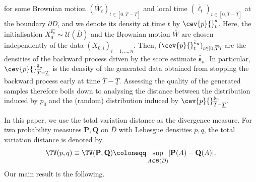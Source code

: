 \documentclass[a4paper, 11pt, headings = small, abstract]{scrartcl}
\begin{document}
for some Brownian motion $(\overline{W}_t)_{t \in [0, \overline{T} - \underline{T}]}$ and local time $(\overline{\ell}_t)_{t \in [0, \overline{T} - \underline{T}]}$ at the boundary $\partial D$, and we denote its density at time $t$ by $\cev{p}{}^{\mathfrak{s}}_t$. Here, the initialisation $X^{\hat{\mathfrak{s}_n}}_0 \sim \mathcal{U}(\overline{D})$ and the Brownian motion $\overline{W}$ are chosen independently of the data $(X_{0,i})_{i = 1,\ldots,n}$.   Then, $(\cev{p}{}^{\hat{\mathfrak{s}}_n}_t)_{t \in [0, \overline{T})}$ are the densities of the backward process driven by the score estimate $\hat{\mathfrak{s}}_n$. In particular, $\cev{p}{}^{\hat{\mathfrak{s}}_n}_{\overline{T}-\underline{T}}$ is the density of the generated data obtained from stopping the backward process early at time $\overline{T} - \underline{T}$. Assessing the quality of the generated samples therefore boils down to analysing the distance between the distribution induced by $p_0$ and the (random) distribution induced by $\cev{p}{}^{\hat{\mathfrak{s}}_n}_{\overline{T}-\underline{T}}$.

In this paper, we use the total variation distance as the divergence measure. For two probability measures $\mathbf{P},\mathbf{Q}$ on $\overline{D}$ with Lebesgue densities $p,q$, the total variation distance is denoted by
\[\TV(p,q) \equiv \TV(\mathbf{P},\mathbf{Q}) \coloneqq \sup_{A \in \mathcal{B}(\overline{D})} \lvert \mathbf{P}(A) - \mathbf{Q}(A)\rvert.\]
Our main result is the following.
\end{document}
